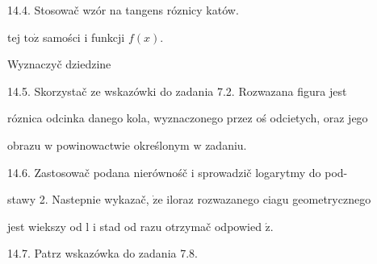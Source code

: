 \documentclass[a4paper,12pt]{article}
\begin{document}
14.4. Stosowač wzór na tangens róznicy katów.

tej $\mathrm{t}\mathrm{o}\dot{\mathrm{z}}$ samości $\mathrm{i}$ funkcji $f(x).$

Wyznaczyč dziedzine

14.5. Skorzystač ze wskazówki do zadania 7.2. Rozwazana figura jest

róznica odcinka danego kola, wyznaczonego przez oś odcietych, oraz jego

obrazu $\mathrm{w}$ powinowactwie określonym $\mathrm{w}$ zadaniu.

14.6. Zastosowač podana nierównośč $\mathrm{i}$ sprowadzič logarytmy do pod-

stawy 2. Nastepnie wykazač, $\dot{\mathrm{z}}\mathrm{e}$ iloraz rozwazanego ciagu geometrycznego

jest wiekszy od l $\mathrm{i}$ stad od razu otrzymač odpowied $\acute{\mathrm{z}}.$

14.7. Patrz wskazówka do zadania 7.8.
\end{document}
